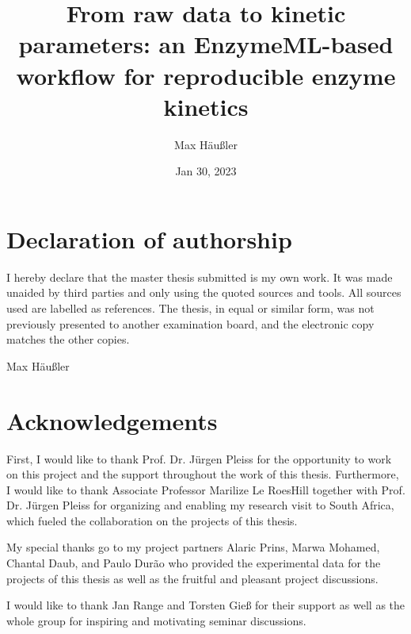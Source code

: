 \documentclass[letterpaper,12pt,english]{jupyterBook}
\title{From raw data to kinetic parameters: an EnzymeML-based workflow for reproducible enzyme kinetics}
\date{Jan 30, 2023}
\author{Max Häußler}
\begin{document}
\pagestyle{empty}
\sphinxmaketitle

\pagestyle{plain}
\setcounter{tocdepth}{3}
\sphinxtableofcontents


\sphinxstepscope


\chapter*{Declaration of authorship}
\label{\detokenize{declaration:declaration-of-authorship}}\label{\detokenize{declaration::doc}}
\sphinxAtStartPar
I hereby declare that the master thesis submitted is my own work. It was made unaided by third parties and only using the quoted sources and tools. All sources used are labelled as references. The thesis, in equal or similar form, was not previously presented to another examination board, and the electronic copy matches the other copies.

\sphinxAtStartPar
Max Häußler

\sphinxstepscope

\chapter*{Acknowledgements}
\label{\detokenize{acknowledgements:acknowledgements}}\label{\detokenize{acknowledgements::doc}}
\sphinxAtStartPar
First, I would like to thank Prof. Dr. Jürgen Pleiss for the opportunity to work on this project and the support throughout the work of this thesis.
Furthermore, I would like to thank Associate Professor Marilize Le Roes\sphinxhyphen{}Hill together with Prof. Dr. Jürgen Pleiss for organizing and enabling my research visit to South Africa, which fueled the collaboration on the projects of this thesis.

\sphinxAtStartPar
My special thanks go to my project partners Alaric Prins, Marwa Mohamed, Chantal Daub, and Paulo Durão who provided the experimental data for the projects of this thesis as well as the fruitful and pleasant project discussions.

\sphinxAtStartPar
I would like to thank Jan Range and Torsten Gieß for their support as well as the whole group for inspiring and motivating seminar discussions.

\sphinxstepscope
\pagestyle{plain}
\end{document}
